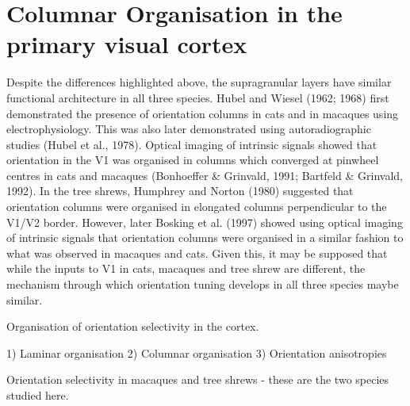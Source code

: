 \section{Columnar Organisation in the primary visual cortex}
Despite the differences highlighted above, the supragranular layers have similar functional architecture in all three species. Hubel and Wiesel (1962; 1968) first demonstrated the presence of orientation columns in cats and in macaques using electrophysiology. This was also later demonstrated using autoradiographic studies (Hubel et al., 1978). Optical imaging of intrinsic signals showed that orientation in the V1 was organised in columns which converged at pinwheel centres in cats and macaques (Bonhoeffer \& Grinvald, 1991; Bartfeld \& Grinvald, 1992). In the tree shrews, Humphrey and Norton (1980) suggested that orientation columns were organised in elongated columns perpendicular to the V1/V2 border. However, later Bosking et al. (1997) showed using optical imaging of intrinsic signals that orientation columns were organised in a similar fashion to what was observed in macaques and cats. Given this, it may be supposed that while the inputs to V1 in cats, macaques and tree shrew are different, the mechanism through which orientation tuning develops in all three species maybe similar. 

Organisation of orientation selectivity in the cortex.

1) Laminar organisation
2) Columnar organisation
3) Orientation anisotropies

Orientation selectivity in macaques and tree shrews - these are the two species studied here.

